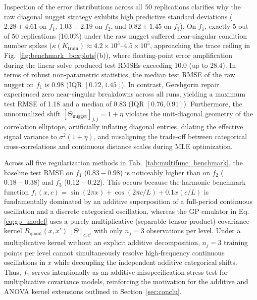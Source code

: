 \documentclass[default,sn-mathphys,Numbered]{sn-jnl}
\theoremstyle{thmstyleone}
\theoremstyle{thmstylethree}
\theoremstyle{thmstyletwo}
\newcommand{\eqnref}[1]{\eqref{#1}}
\begin{document}
Inspection of the error distributions across all 50 replications clarifies why the raw diagonal nugget strategy exhibits high predictive standard deviations ($2.28 \pm 4.61$ on $f_1$, $1.03 \pm 2.19$ on $f_2$, and $0.82 \pm 1.45$ on $f_3$). On $f_1$, exactly 5 out of 50 replications (10.0\%) under the raw nugget suffered near-singular condition number spikes ($\kappa(K_{\mathrm{train}}) \approx 4.2 \times 10^5\text{--}4.5 \times 10^5$, approaching the trace ceiling in Fig.~\ref{fig:benchmark_boxplots}(b)), where floating-point error amplification during the linear solve produced test RMSEs exceeding 10.0 (up to 28.4). In terms of robust non-parametric statistics, the median test RMSE of the raw nugget on $f_1$ is 0.98 (IQR $[0.72, 1.45]$). In contrast, Gershgorin repair experienced zero near-singular breakdowns across all runs, yielding a maximum test RMSE of 1.18 and a median of 0.83 (IQR $[0.76, 0.91]$). Furthermore, the unnormalized shift $[\Theta_{\mathrm{nugget}}]_{j, j} = 1 + \eta$ violates the unit-diagonal geometry of the correlation elliptope, artificially inflating diagonal entries, dilating the effective signal variance to $\sigma^2(1+\eta)$, and misaligning the trade-off between categorical cross-correlations and continuous distance scales during MLE optimization.

Across all five regularization methods in Tab.~\ref{tab:multifunc_benchmark}, the baseline test RMSE on $f_1$ ($0.83 - 0.98$) is noticeably higher than on $f_2$ ($0.18 - 0.38$) and $f_3$ ($0.12 - 0.22$). This occurs because the harmonic benchmark function $f_1(x, c) = \sin(2\pi x) + \cos(2\pi c/L) + 0.1 x (c/L)$ is fundamentally dominated by an additive superposition of a full-period continuous oscillation and a discrete categorical oscillation, whereas the GP emulator in Eq.\eqnref{eq:gp_model} uses a purely multiplicative (separable tensor product) covariance kernel $R_{\mathrm{quant}}(x, x') \, [\Theta]_{c, c'}$ with only $n_j = 3$ observations per level. Under a multiplicative kernel without an explicit additive decomposition, $n_j = 3$ training points per level cannot simultaneously resolve high-frequency continuous oscillations in $x$ while decoupling the independent additive categorical shifts. Thus, $f_1$ serves intentionally as an additive misspecification stress test for multiplicative covariance models, reinforcing the motivation for the additive and ANOVA kernel extensions outlined in Section~\ref{sec:conclu}.
\end{document}
